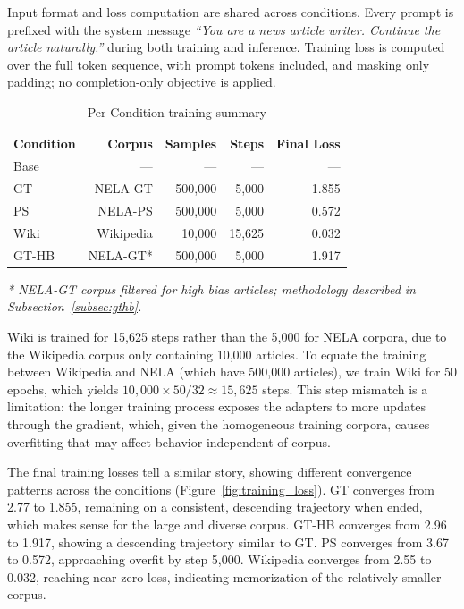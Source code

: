 \documentclass[12pt]{article}
\begin{document}
Input format and loss computation are shared across conditions.
Every prompt is prefixed with the system message \textit{``You are a news article writer. Continue the article naturally.''} during both training and inference. 
Training loss is computed over the full token sequence, with prompt tokens included, and masking only padding; no completion-only objective is applied.

\begin{table}[htbp]
  \centering
  \caption{Per-Condition training summary}
  \label{tab:training_conditions}
  \begin{tabular}{lrrrr}
    \toprule
    Condition & Corpus & Samples & Steps & Final Loss \\
    \midrule
    Base  & ---       & ---       & ---      & ---   \\
    GT    & NELA-GT   & 500{,}000 & 5{,}000  & 1.855 \\
    PS    & NELA-PS   & 500{,}000 & 5{,}000  & 0.572 \\
    Wiki  & Wikipedia & 10{,}000  & 15{,}625 & 0.032 \\
    GT-HB & NELA-GT*  & 500{,}000 & 5{,}000  & 1.917 \\
    \bottomrule
  \end{tabular}

  \vspace{4pt}
  {\small\textit{* NELA-GT corpus filtered for high bias articles; methodology described in Subsection~\ref{subsec:gthb}.}}
\end{table}

Wiki is trained for 15{,}625 steps rather than the 5{,}000 for NELA corpora, due to the Wikipedia corpus only containing 10{,}000 articles. 
To equate the training between Wikipedia and NELA (which have 500{,}000 articles), we train Wiki for 50 epochs, which yields $10{,}000 \times 50 / 32 \approx 15{,}625$ steps.
This step mismatch is a limitation: the longer training process exposes the adapters to more updates through the gradient, which, given the homogeneous training corpora, causes overfitting that may affect behavior independent of corpus.  

The final training losses tell a similar story, showing different convergence patterns across the conditions (Figure~\ref{fig:training_loss}).
GT converges from 2.77 to 1.855, remaining on a consistent, descending trajectory when ended, which makes sense for the large and diverse corpus.
GT-HB converges from 2.96 to 1.917, showing a descending trajectory similar to GT.
PS converges from 3.67 to 0.572, approaching overfit by step 5{,}000. 
Wikipedia converges from 2.55 to 0.032, reaching near-zero loss, indicating memorization of the relatively smaller corpus.
\end{document}
